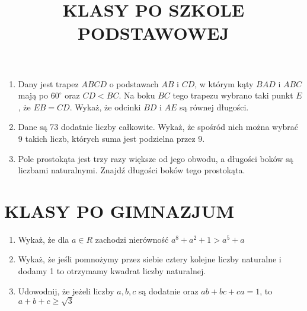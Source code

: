 \documentclass[10pt]{article}
\title{KLASY PO SZKOLE PODSTAWOWEJ }
\author{}
\date{}
\begin{document}
\maketitle
\begin{enumerate}
  \item Dany jest trapez \(A B C D\) o podstawach \(A B\) i \(C D\), w którym kąty \(B A D\) i \(A B C\) mają po \(60^{\circ}\) oraz \(C D<B C\). Na boku \(B C\) tego trapezu wybrano taki punkt \(E\), że \(E B=C D\). Wykaż, że odcinki \(B D\) i \(A E\) są równej długości.
  \item Dane są 73 dodatnie liczby całkowite. Wykaż, że spośród nich można wybrać 9 takich liczb, których suma jest podzielna przez 9.
  \item Pole prostokąta jest trzy razy większe od jego obwodu, a długości boków są liczbami naturalnymi. Znajdź długości boków tego prostokąta.
\end{enumerate}

\section*{KLASY PO GIMNAZJUM}
\begin{enumerate}
  \item Wykaż, że dla \(a \in R\) zachodzi nierówność \(a^{8}+a^{2}+1>a^{5}+a\)
  \item Wykaż, że jeśli pomnożymy przez siebie cztery kolejne liczby naturalne i dodamy 1 to otrzymamy kwadrat liczby naturalnej.
  \item Udowodnij, że jeżeli liczby \(a, b, c\) są dodatnie oraz \(a b+b c+c a=1\), to \(a+b+c \geq \sqrt{3}\)
\end{enumerate}
\end{document}
